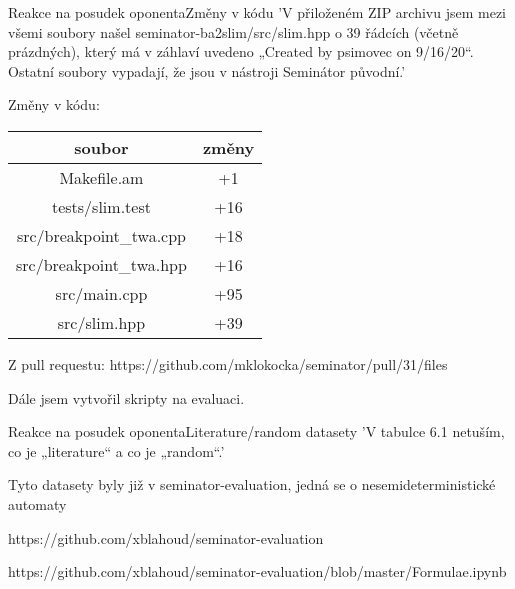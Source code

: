 \documentclass[
]{beamer}
\newcommand{\hlineny}{\hline}
\begin{document}
	\begin{frame}{Reakce na posudek oponenta}{Změny v kódu}
		'V přiloženém ZIP archivu jsem mezi všemi soubory našel seminator-ba2slim/src/slim.hpp o 39 řádcích (včetně prázdných),  který má v záhlaví uvedeno  „Created by psimovec on 9/16/20“.  Ostatní soubory vypadají, že jsou v nástroji Seminátor původní.'
		
		Změny v kódu:
		
	\begin{table}[ht]
		\centering
		
		
		
		\begin{tabular}{|c|c|}
			\hline
			soubor  &   změny \\
			\hline
			Makefile.am & +1\\
			\hlineny
			tests/slim.test          &       +16 \\
			
			\hline
			src/breakpoint\_twa.cpp    &     +18 \\
			\hline
			src/breakpoint\_twa.hpp      &        +16 \\
			\hlineny
			src/main.cpp&  	+95\\\hlineny
			src/slim.hpp&+39\\\hline
			
		\end{tabular}
	\end{table}
		Z pull requestu: https://github.com/mklokocka/seminator/pull/31/files
		
					
		Dále jsem vytvořil skripty na evaluaci.
	\end{frame}

	\begin{frame}{Reakce na posudek oponenta}{Literature/random datasety}
		'V tabulce 6.1 netuším, co je „literature“ a co je „random“.'
		
		Tyto datasety byly již v seminator-evaluation, jedná se o nesemideterministické automaty
		
		
		{https://github.com/xblahoud/seminator-evaluation}
		
		{https://github.com/xblahoud/seminator-evaluation/blob/master/Formulae.ipynb}
		
	\end{frame}
	
	\section{\bibname}
	\begin{frame}[t, allowframebreaks]{\bibname}
		\printbibliography[heading=none]
	\end{frame}
	
	
\end{document}
